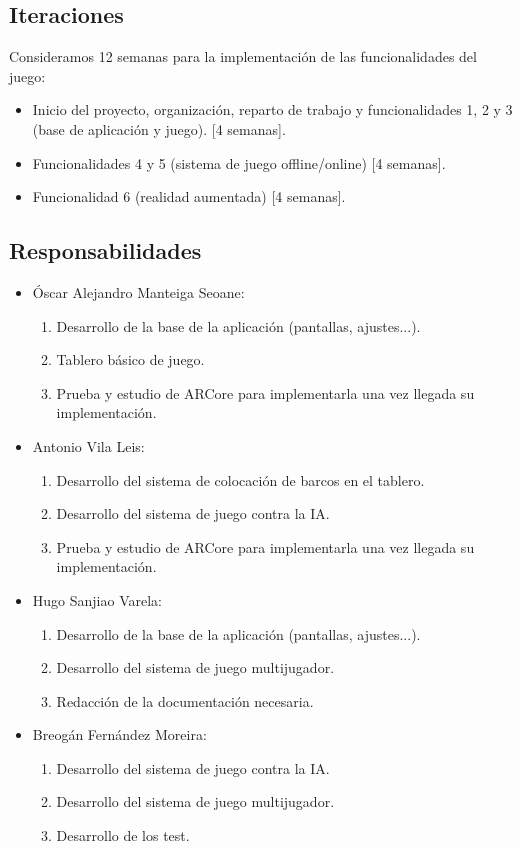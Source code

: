 \documentclass[a4paper, openright, 12pt]{article}
\begin{document}
\subsection{Iteraciones}
Consideramos 12 semanas para la implementación de las funcionalidades del juego:
\begin{itemize}
    \item Inicio del proyecto, organización, reparto de trabajo y funcionalidades 1, 2 y 3 (base de aplicación y juego). [4 semanas].
    \item Funcionalidades 4 y 5 (sistema de juego offline/online) [4 semanas].
    \item Funcionalidad 6 (realidad aumentada) [4 semanas].
\end{itemize}
\subsection{Responsabilidades}
\begin{itemize}
    \item Óscar Alejandro Manteiga Seoane:
        \begin{enumerate}
            \item Desarrollo de la base de la aplicación (pantallas, ajustes...).
            \item Tablero básico de juego.
            \item Prueba y estudio de ARCore para implementarla una vez llegada su implementación.
        \end{enumerate}
    \item Antonio Vila Leis:
        \begin{enumerate}
            \item Desarrollo del sistema de colocación de barcos en el tablero.
            \item Desarrollo del sistema de juego contra la IA.
            \item Prueba y estudio de ARCore para implementarla una vez llegada su implementación.
        \end{enumerate}
    \item Hugo Sanjiao Varela:
        \begin{enumerate}
            \item Desarrollo de la base de la aplicación (pantallas, ajustes...).
            \item Desarrollo del sistema de juego multijugador.
            \item Redacción de la documentación necesaria.
        \end{enumerate}
    \item Breogán Fernández Moreira:
        \begin{enumerate}
            \item Desarrollo del sistema de juego contra la IA.
            \item Desarrollo del sistema de juego multijugador.
            \item Desarrollo de los test.
        \end{enumerate}
\end{itemize}
\end{document}
